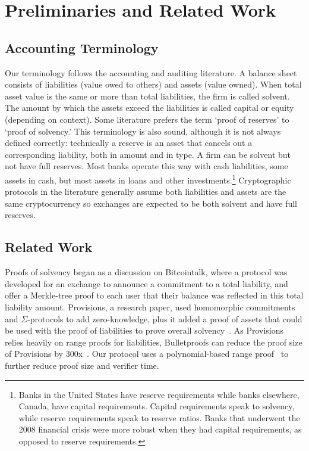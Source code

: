 \chapter{Preliminaries and Related Work}

\section{Accounting Terminology}

Our terminology follows the accounting and auditing literature. A balance sheet consists of liabilities (value owed to others) and assets (value owned). When total asset value is the same or more than total liabilities, the firm is called solvent. The amount by which the assets exceed the liabilities is called capital or equity (depending on context). Some literature prefers the term `proof of reserves' to `proof of solvency.' This terminology is also sound, although it is not always defined correctly: technically a reserve is an asset that cancels out a corresponding liability, both in amount and in type. A firm can be solvent but not have full reserves. Most banks operate this way with cash liabilities, some assets in cash, but most assets in loans and other investments.\footnote{Banks in the United States have reserve requirements while banks elsewhere, \eg Canada, have capital requirements. Capital requirements speak to solvency, while reserve requirements speak to reserve ratios. Banks that underwent the 2008 financial crisis were more robust when they had capital requirements, as opposed to reserve requirements.} Cryptographic protocols in the literature generally assume both liabilities and assets are the same cryptocurrency so exchanges are expected to be both solvent and have full reserves.

\section{Related Work}
\label{sec:rw}



Proofs of solvency began as a discussion on Bitcointalk, where a protocol was developed for an exchange to announce a commitment to a total liability, and offer a Merkle-tree proof to each user that their balance was reflected in this total liability amount. Provisions, a research paper, used homomorphic commitments and $\Sigma$-protocols to add zero-knowledge, plus it added a proof of assets that could be used with the proof of liabilities to prove overall solvency~\cite{provisions}. As Provisions relies heavily on range proofs for liabilities, Bulletproofs can reduce the proof size of Provisions by 300x~\cite{bulletproofs}. Our protocol uses a polynomial-based range proof~\cite{rangeproof} to further reduce proof size and verifier time.

